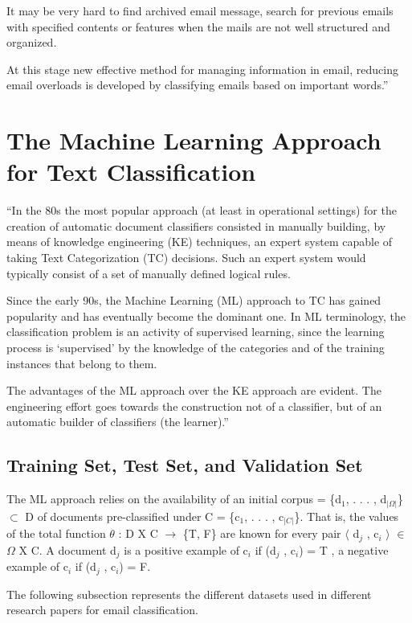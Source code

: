 It may be very hard to find archived email message, search for previous 
emails with specified contents or features when the mails are not well 
structured and organized.

At this stage new effective method for managing information in email, 
reducing email overloads is developed by classifying emails based on 
important words.'' \cite{taiwo2007}

\section{The Machine Learning Approach for Text Classification}
\label{sec:ml_approach_text_classification}

``In the 80s the most popular approach (at least in operational settings) for the
creation of automatic document classifiers consisted in manually building, by means
of knowledge engineering (KE) techniques, an expert system capable of taking
Text Categorization (TC) decisions. Such an expert system would typically
consist of a set of manually defined logical rules.

Since the early 90s, the Machine Learning (ML) approach to TC has gained 
popularity and has eventually become the dominant one. In ML terminology, the 
classification problem is an activity of supervised learning, since the learning 
process is `supervised' by the knowledge of the categories and of the training 
instances that belong to them.

The advantages of the ML approach over the KE approach are evident. The 
engineering effort goes towards the construction not of a classifier, 
but of an automatic builder of classifiers (the learner).'' \cite{Sebastiani2002}

\subsection{Training Set, Test Set, and Validation Set}
The ML approach relies on the availability of an initial 
corpus = \{d$_{1}$, . . . , d$_{|\Omega|}$\} $\subset$ D of documents 
pre-classified under C = \{c$_{1}$, . . . , c$_{|C|}$\}. That is, the values of 
the total function $\theta$ : D X C $\rightarrow$ \{T, F\} are known for every 
pair $\langle$ d$_{j}$ , c$_{i}$ $\rangle$ $\in$   $\Omega$ X C. A document 
d$_{j}$ is a positive example of c$_{i}$ if (d$_{j}$ , c$_{i}$) = T , a negative 
example of c$_{i}$ if (d$_{j}$ , c$_{i}$) = F.

The following subsection represents the different datasets used in different research papers for email classification.

